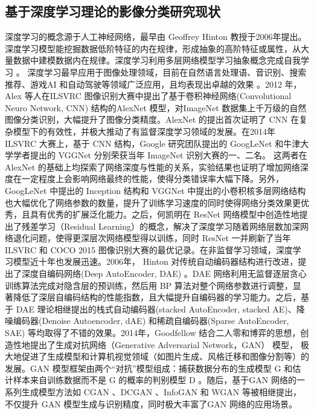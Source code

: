 \subsection{基于深度学习理论的影像分类研究现状}
\label{subsec:1-2-2}
深度学习的概念源于人工神经网络，最早由 Geoffrey Hinton \cite{hinton2006fast} 教授于2006年提出。深度学习模型能挖掘数据低阶特征的内在规律，形成抽象的高阶特征或属性，从大量数据中建模数据内在规律。深度学习利用多层网络模型学习抽象概念完成自我学习 \cite{lecun2015deep}。 深度学习最早应用于图像处理领域，目前在自然语言处理语、音识别、搜索推荐、游戏AI 和自动驾驶等领域广泛应用，且均表现出卓越的效果 \cite{bengio2009learning}。2012 年，Alex 等人在ILSVRC 图像识别大赛中提出了基于卷积神经网络(Convolutional Neuro Network, CNN) 结构的AlexNet \cite{NIPS2012_4824} 模型，对ImageNet 数据集上千万级的自然图像分类识别，大幅提升了图像分类精度。AlexNet 的提出首次证明了 CNN 在复杂模型下的有效性，并极大推动了有监督深度学习领域的发展。在2014年 ILSVRC 大赛上，基于 CNN 结构，Google 研究团队提出的 GoogLeNet \cite{szegedy2015going} 和牛津大学学者提出的 VGGNet \cite{simonyan2014very} 分别荣获当年 ImageNet 识别大赛的一、二名。 这两者在 AlexNet 的基础上均探索了网络深度与性能的关系，实验结果也证明了增加网络深度在一定程度上会影响网络最终的性能，使得分类错误率大幅下降。另外，GoogLeNet 中提出的 Inception 结构和 VGGNet 中提出的小卷积核多层网络结构也大幅优化了网络参数的数量，提升了训练学习速度的同时使得网络分类效果更优秀，且具有优秀的扩展泛化能力。之后，何凯明在 ResNet \cite{he2016deep} 网络模型中创造性地提出了残差学习（Residual Learning）的概念，解决了深度学习随着网络层数加深网络退化问题，使得更深层次网络模型得以训练，同时 ResNet 一并刷新了当年 ILSVRC 和 COCO 2015 图像识别大赛的最优记录。在非监督学习领域，深度学习模型近十年也发展迅速。2006年， Hinton 对传统自动编码器结构进行改进，提出了深度自编码网络(Deep AutoEncoder, DAE) \cite{hinton2006fast}。DAE 网络利用无监督逐层贪心训练算法完成对隐含层的预训练，然后用 BP 算法对整个网络参数进行调整，显著降低了深层自编码结构的性能指数，且大幅提升自编码器的学习能力。之后，基于 DAE 理论相继提出的栈式自动编码器(stacked AutoEncoder, stacked AE)\cite{bengio2007greedy}、降噪编码器(Denoise Autoencoder, dAE)\cite{vincent2008extracting} 和稀疏自编码器(Sparse AutoEncoder, SAE)\cite{ng2011sparse} 等均取得了不错的效果。2014年，Goodfellow 结合二人零和博弈的思想，创造性地提出了生成对抗网络（Generative Adversarial Network，GAN）\cite{goodfellow2014generative} 模型， 极大地促进了生成模型和计算机视觉领域（如图片生成、风格迁移和图像分割等）的发展。GAN 模型框架由两个“对抗”模型组成：捕获数据分布的生成模型 G 和估计样本来自训练数据而不是 G 的概率的判别模型 D 。随后，基于GAN 网络的一系列生成模型方法如 CGAN\cite{mirza2014conditional} 、DCGAN \cite{radford2015unsupervised} 、InfoGAN \cite{chen2016infogan} 和 WGAN \cite{arjovsky2017wasserstein} 等被相继提出，不仅提升 GAN 模型生成与识别精度，同时极大丰富了GAN 网络的应用场景。

